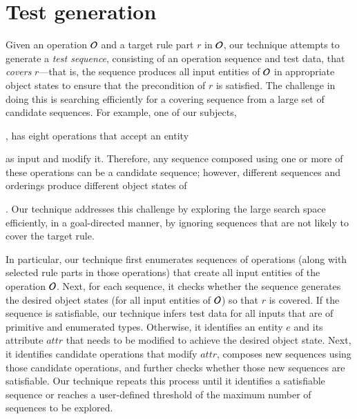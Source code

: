 \section{Test generation}

Given an operation ${\cal O}$ and a target rule part $r$ in ${\cal O}$, our
technique attempts to generate a \textit{test sequence}, consisting of an
operation sequence and test data, that \textit{covers} $r$---that is, the
sequence produces all input entities of ${\cal O}$ in appropriate object states
to ensure that the precondition of $r$ is satisfied. The challenge in doing this
is searching efficiently for a covering sequence from a large set of candidate
sequences. For example, one of our subjects, \subject{Cebu-pacific}, has eight
operations that accept an entity \subject{Ticket} as input and modify
it. Therefore, any sequence composed using one or more of these operations can
be a candidate sequence; however, different sequences and orderings produce
different object states of \subject{Ticket}. Our technique addresses this
challenge by exploring the large search space efficiently, in a goal-directed
manner, by ignoring sequences that are not likely to cover the target rule.


In particular, our technique first enumerates sequences of operations (along
with selected rule parts in those operations) that create all input entities of
the operation ${\cal O}$.  Next, for each sequence, it checks whether the
sequence generates the desired object states (for all input entities of ${\cal
  O}$) so that $r$ is covered. If the sequence is satisfiable, our technique
infers test data for all inputs that are of primitive and enumerated types.
Otherwise, it identifies an entity $e$ and its attribute $attr$ that needs to be
modified to achieve the desired object state. Next, it identifies candidate
operations that modify $attr$, composes new sequences using those candidate
operations, and further checks whether those new sequences are satisfiable. Our
technique repeats this process until it identifies a satisfiable sequence or
reaches a user-defined threshold of the maximum number of sequences to be
explored.

